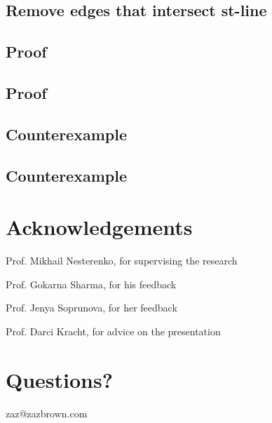 \documentclass[11pt]{article}
\begin{document}
\subsection*{Remove edges that intersect st-line}
\label{sec:org2f8535b}
\begin{center}

\end{center}
\subsection*{Proof}
\label{sec:orgbca7f04}
\begin{center}

\end{center}
\subsection*{Proof}
\label{sec:orgab12a8a}
\begin{center}

\end{center}
\subsection*{Counterexample}
\label{sec:orgb83bca9}
\begin{center}

\end{center}
\subsection*{Counterexample}
\label{sec:org952c4eb}
\begin{center}

\end{center}
\section*{Acknowledgements}
\label{sec:orgade0fc3}

Prof. Mikhail Nesterenko, for supervising the research

Prof. Gokarna Sharma, for his feedback

Prof. Jenya Soprunova, for her feedback

Prof. Darci Kracht, for advice on the presentation
\section*{Questions?}
\label{sec:org52fd84d}

zaz@zazbrown.com
\end{document}
